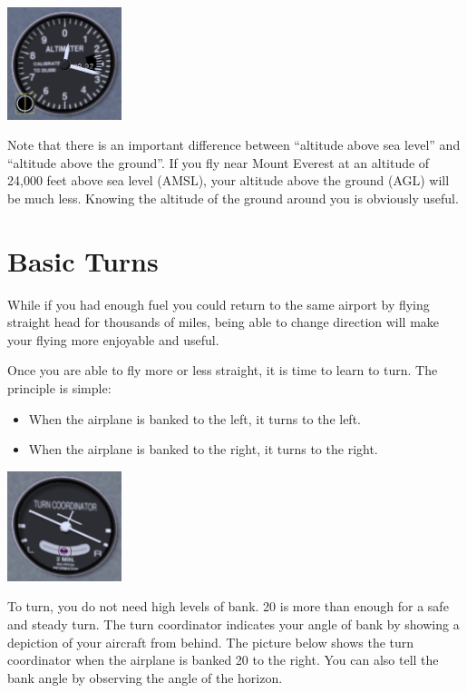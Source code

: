 \begin{itemize}
\begin{center}
\includegraphics[width=0.25\textwidth]{img/tut_18}
\end{center}

Note that there is an important difference between ``altitude above sea
level'' and ``altitude above the ground''. If you fly near Mount Everest at an
altitude of 24,000 feet above sea level (AMSL), your altitude above the ground
(AGL) will be much less. Knowing the altitude of the ground around you is
obviously useful.

\section{Basic Turns}
\label{sec:InFlightTurning}

While if you had enough fuel you could return to the same airport by flying
straight head for thousands of miles, being able to change direction will
make your flying more enjoyable and useful.

Once you are able to fly more or less straight, it is time to
learn to turn. The principle is simple:
\begin{itemize}
    \item When the airplane is banked to the left, it turns to the left.
  \item When the airplane is banked to the right, it turns to the right.
\end{itemize}

\begin{center}
\includegraphics[width=0.25\textwidth]{img/tut_19}
\end{center}

 To turn, you do not need high levels of bank.
20\textdegree{} is more than enough for a safe and steady turn. The turn
coordinator indicates your angle of bank by showing a depiction of your aircraft
from behind. The picture below shows the turn coordinator when the airplane is
banked 20\textdegree{} to the right. You can also tell the bank angle by
observing the angle of the horizon.


\end{itemize}
